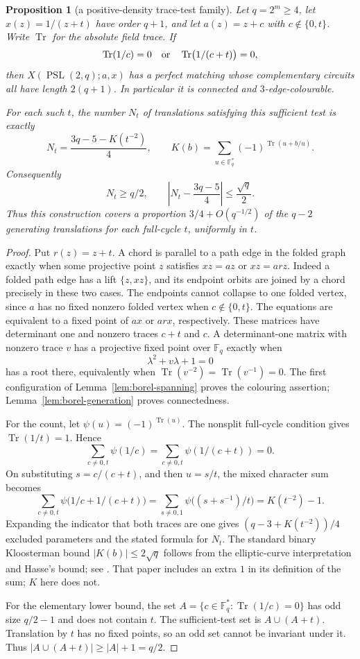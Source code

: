 \documentclass[11pt,a4paper]{article}
\newtheorem{proposition}[theorem]{Proposition}
\theoremstyle{definition}
\theoremstyle{remark}
\newcommand{\PSL}{\operatorname{PSL}}
\newcommand{\X}[3]{X(#1;#2,#3)}
\begin{document}
\begin{proposition}[a positive-density trace-test family]\label{prop:borel-trace}
Let $q=2^m\ge4$, let $x(z)=1/(z+t)$ have order $q+1$, and let $a(z)=z+c$ with $c\notin\{0,t\}$.  Write $\operatorname{Tr}$ for the absolute field trace.  If
\[
 \operatorname{Tr}(1/c)=0\quad\hbox{or}\quad
 \operatorname{Tr}\bigl(1/(c+t)\bigr)=0,
\]
then $\X{\PSL(2,q)}{a}{x}$ has a perfect matching whose complementary circuits all have length $2(q+1)$.  In particular it is connected and $3$-edge-colourable.

For each such $t$, the number $N_t$ of translations satisfying this sufficient test is exactly
\[
 N_t=\frac{3q-5-K(t^{-2})}{4},\qquad
 K(b)=\sum_{u\in\mathbb F_q^*}(-1)^{\operatorname{Tr}(u+b/u)}.
\]
Consequently
\[
 N_t\ge q/2,\qquad
 \left|N_t-\frac{3q-5}{4}\right|\le\frac{\sqrt q}{2}.
\]
Thus this construction covers a proportion $3/4+O(q^{-1/2})$ of the $q-2$ generating translations for each full-cycle $t$, uniformly in $t$.
\end{proposition}
\begin{proof}
Put $r(z)=z+t$.  A chord is parallel to a path edge in the folded graph exactly when some projective point $z$ satisfies $xz=az$ or $xz=arz$.  Indeed a folded path edge has a lift $\{z,xz\}$, and its endpoint orbits are joined by a chord precisely in these two cases.  The endpoints cannot collapse to one folded vertex, since $a$ has no fixed nonzero folded vertex when $c\notin\{0,t\}$.  The equations are equivalent to a fixed point of $ax$ or $arx$, respectively.  These matrices have determinant one and nonzero traces $c+t$ and $c$.  A determinant-one matrix with nonzero trace $v$ has a projective fixed point over $\mathbb F_q$ exactly when
\[
 \lambda^2+v\lambda+1=0
\]
has a root there, equivalently when $\operatorname{Tr}(v^{-2})=\operatorname{Tr}(v^{-1})=0$.  The first configuration of Lemma~\ref{lem:borel-spanning} proves the colouring assertion; Lemma~\ref{lem:borel-generation} proves connectedness.

For the count, let $\psi(u)=(-1)^{\operatorname{Tr}(u)}$.  The nonsplit full-cycle condition gives $\operatorname{Tr}(1/t)=1$.  Hence
\[
 \sum_{c\ne0,t}\psi(1/c)=\sum_{c\ne0,t}\psi(1/(c+t))=0.
\]
On substituting $s=c/(c+t)$, and then $u=s/t$, the mixed character sum becomes
\[
 \sum_{c\ne0,t}\psi\bigl(1/c+1/(c+t)\bigr)
 =\sum_{s\ne0,1}\psi\bigl((s+s^{-1})/t\bigr)
 =K(t^{-2})-1.
\]
Expanding the indicator that both traces are one gives $(q-3+K(t^{-2}))/4$ excluded parameters and the stated formula for $N_t$.  The standard binary Kloosterman bound $|K(b)|\le2\sqrt q$ follows from the elliptic-curve interpretation and Hasse's bound; see \cite[Lemma~2.1 and Section~6.3]{AhmadiGranger12}.  That paper includes an extra $1$ in its definition of the sum; $K$ here does not.

For the elementary lower bound, the set $A=\{c\in\mathbb F_q^*: \operatorname{Tr}(1/c)=0\}$ has odd size $q/2-1$ and does not contain $t$.  The sufficient-test set is $A\cup(A+t)$.  Translation by $t$ has no fixed points, so an odd set cannot be invariant under it.  Thus $|A\cup(A+t)|\ge |A|+1=q/2$.
\end{proof}
\end{document}
